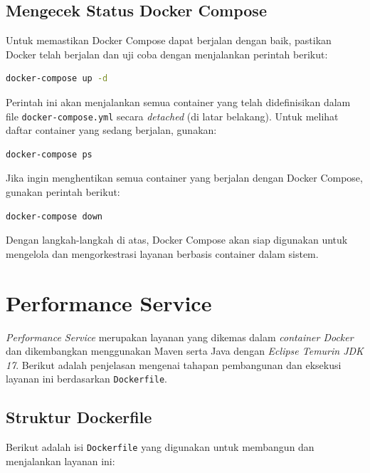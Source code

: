 \subsection{Mengecek Status Docker Compose}

Untuk memastikan Docker Compose dapat berjalan dengan baik, pastikan Docker telah berjalan dan uji coba dengan menjalankan perintah berikut:

\begin{lstlisting}[language=bash]
	docker-compose up -d
\end{lstlisting}

Perintah ini akan menjalankan semua container yang telah didefinisikan dalam file \texttt{docker-compose.yml} secara \textit{detached} (di latar belakang). Untuk melihat daftar container yang sedang berjalan, gunakan:

\begin{lstlisting}[language=bash]
	docker-compose ps
\end{lstlisting}

Jika ingin menghentikan semua container yang berjalan dengan Docker Compose, gunakan perintah berikut:

\begin{lstlisting}[language=bash]
	docker-compose down
\end{lstlisting}

Dengan langkah-langkah di atas, Docker Compose akan siap digunakan untuk mengelola dan mengorkestrasi layanan berbasis container dalam sistem.



\section{Performance Service}

\textit{Performance Service} merupakan layanan yang dikemas dalam \textit{container Docker} dan dikembangkan menggunakan Maven serta Java dengan \textit{Eclipse Temurin JDK 17}. Berikut adalah penjelasan mengenai tahapan pembangunan dan eksekusi layanan ini berdasarkan \texttt{Dockerfile}.

\subsection{Struktur Dockerfile}

Berikut adalah isi \texttt{Dockerfile} yang digunakan untuk membangun dan menjalankan layanan ini:

